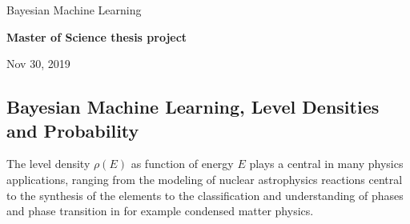 \documentclass[%
oneside,                 %
final,                   %
10pt]{article}
\begin{document}

\newcommand{\exercisesection}[1]{\subsection*{#1}}






\thispagestyle{empty}

\begin{center}
{\LARGE\bf
\begin{spacing}{1.25}
Bayesian Machine Learning
\end{spacing}
}
\end{center}


\begin{center}
{\bf Master of Science thesis project${}^{}$} \\ [0mm]
\end{center}

\begin{center}
\end{center}
    

\begin{center}
Nov 30, 2019
\end{center}

\vspace{1cm}


\subsection{Bayesian Machine Learning, Level Densities and Probability}

The level density $\rho(E)$ as function of energy $E$ plays a central in many
physics applications, ranging from the modeling of nuclear
astrophysics reactions central to the synthesis of the elements to the
classification and understanding of phases and phase transition in for example condensed matter
physics.
\end{document}

